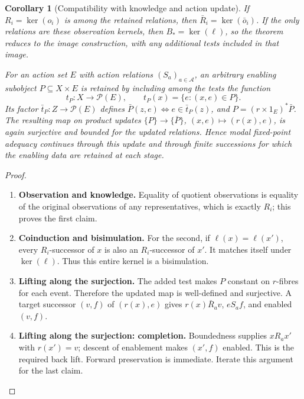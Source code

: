 \documentclass[11pt,a4paper]{article}
\numberwithin{equation}{section}
\newtheorem{corollary}[theorem]{Corollary}
\theoremstyle{definition}
\theoremstyle{remark}
\theoremstyle{plain}
\begin{document}
\begin{corollary}[Compatibility with knowledge and action update]
\label{cor:egt-exact-refinement-action}
If $R_i=\ker(o_i)$ is among the retained relations, then
$\bar R_i=\ker(\bar o_i)$. If the only relations are these observation
kernels, then $B_*=\ker(\ell)$, so the theorem reduces to the image
construction, with any additional tests included in that image.

For an action set $E$ with action relations $(S_a)_{a\in\mathcal A}$,
an arbitrary enabling subobject $P\subseteq X\times E$ is retained
by including among the tests the function
\[
 t_P:X\to\mathcal P(E),\qquad t_P(x)=\{e:(x,e)\in P\}.
\]
Its factor $\bar t_P:Z\to\mathcal P(E)$ defines
$\bar P(z,e)\Longleftrightarrow e\in\bar t_P(z)$, and
$P=(r\times1_E)^*\bar P$. The resulting map on product updates
$\{P\}\to\{\bar P\}$, $(x,e)\mapsto(r(x),e)$, is again
surjective and bounded for the updated relations. Hence modal
fixed-point adequacy continues through this update and through finite
successions for which the enabling data are retained at each stage.
\end{corollary}
\begin{proof}
\leavevmode
\begin{enumerate}[label=\textup{(\arabic*)},leftmargin=*,itemsep=4pt,topsep=3pt]
  \item \textbf{Observation and knowledge.} Equality of quotient observations is equality of the original observations
of any representatives, which is exactly $R_i$; this proves the first claim.
  \item \textbf{Coinduction and bisimulation.} For the second, if $\ell(x)=\ell(x')$, every $R_i$-successor of $x$
is also an $R_i$-successor of $x'$. It matches itself under
$\ker(\ell)$. Thus this entire kernel is a bisimulation.
  \item \textbf{Lifting along the surjection.} The added test makes $P$ constant on $r$-fibres for each event. Therefore
the updated map is well-defined and surjective. A target successor
$(v,f)$ of $(r(x),e)$ gives $r(x)\bar R_av$, $eS_af$, and enabled
$(v,f)$.
  \item \textbf{Lifting along the surjection: completion.} Boundedness supplies $xR_ax'$ with $r(x')=v$; descent of
enablement makes $(x',f)$ enabled. This is the required back lift. Forward preservation is immediate. Iterate this argument for the last claim.
\end{enumerate}
\end{proof}
\end{document}
